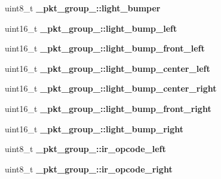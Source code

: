 \begin{DoxyCompactItemize}
\item 
\hypertarget{group__roomba-lib_gac6084afbf012a1c3449767437e10f44a}{}uint8\+\_\+t {\bfseries \+\_\+pkt\+\_\+group\+\_\+::light\+\_\+bumper}\label{group__roomba-lib_gac6084afbf012a1c3449767437e10f44a}

\item 
\hypertarget{group__roomba-lib_ga813e5c6653ac466e27a4949f7383ee61}{}uint16\+\_\+t {\bfseries \+\_\+pkt\+\_\+group\+\_\+::light\+\_\+bump\+\_\+left}\label{group__roomba-lib_ga813e5c6653ac466e27a4949f7383ee61}

\item 
\hypertarget{group__roomba-lib_ga454aa5afd6aafd4b0b0056b4fca7b54b}{}uint16\+\_\+t {\bfseries \+\_\+pkt\+\_\+group\+\_\+::light\+\_\+bump\+\_\+front\+\_\+left}\label{group__roomba-lib_ga454aa5afd6aafd4b0b0056b4fca7b54b}

\item 
\hypertarget{group__roomba-lib_ga21173a24d9d565080337949a7f4e70eb}{}uint16\+\_\+t {\bfseries \+\_\+pkt\+\_\+group\+\_\+::light\+\_\+bump\+\_\+center\+\_\+left}\label{group__roomba-lib_ga21173a24d9d565080337949a7f4e70eb}

\item 
\hypertarget{group__roomba-lib_gacfa0c799a61aad0346f4fdde5236cb08}{}uint16\+\_\+t {\bfseries \+\_\+pkt\+\_\+group\+\_\+::light\+\_\+bump\+\_\+center\+\_\+right}\label{group__roomba-lib_gacfa0c799a61aad0346f4fdde5236cb08}

\item 
\hypertarget{group__roomba-lib_ga9163d7234f5a09246695533984600641}{}uint16\+\_\+t {\bfseries \+\_\+pkt\+\_\+group\+\_\+::light\+\_\+bump\+\_\+front\+\_\+right}\label{group__roomba-lib_ga9163d7234f5a09246695533984600641}

\item 
\hypertarget{group__roomba-lib_gaeea0683ec04f0138be81007ef874fc9c}{}uint16\+\_\+t {\bfseries \+\_\+pkt\+\_\+group\+\_\+::light\+\_\+bump\+\_\+right}\label{group__roomba-lib_gaeea0683ec04f0138be81007ef874fc9c}

\item 
\hypertarget{group__roomba-lib_ga0f46b791af38f118212ca6236513bd91}{}uint8\+\_\+t {\bfseries \+\_\+pkt\+\_\+group\+\_\+::ir\+\_\+opcode\+\_\+left}\label{group__roomba-lib_ga0f46b791af38f118212ca6236513bd91}

\item 
\hypertarget{group__roomba-lib_ga14e1d03ed11234b70c3e6ad9fb42c440}{}uint8\+\_\+t {\bfseries \+\_\+pkt\+\_\+group\+\_\+::ir\+\_\+opcode\+\_\+right}\label{group__roomba-lib_ga14e1d03ed11234b70c3e6ad9fb42c440}


\end{DoxyCompactItemize}
